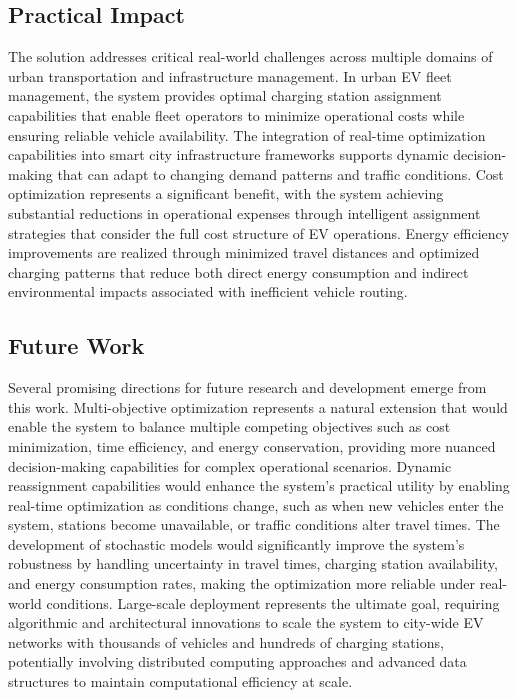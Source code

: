 \documentclass[12pt,a4paper]{article}
\begin{document}
\subsection{Practical Impact}

The solution addresses critical real-world challenges across multiple domains of urban transportation and infrastructure management. In urban EV fleet management, the system provides optimal charging station assignment capabilities that enable fleet operators to minimize operational costs while ensuring reliable vehicle availability. The integration of real-time optimization capabilities into smart city infrastructure frameworks supports dynamic decision-making that can adapt to changing demand patterns and traffic conditions. Cost optimization represents a significant benefit, with the system achieving substantial reductions in operational expenses through intelligent assignment strategies that consider the full cost structure of EV operations. Energy efficiency improvements are realized through minimized travel distances and optimized charging patterns that reduce both direct energy consumption and indirect environmental impacts associated with inefficient vehicle routing.

\subsection{Future Work}

Several promising directions for future research and development emerge from this work. Multi-objective optimization represents a natural extension that would enable the system to balance multiple competing objectives such as cost minimization, time efficiency, and energy conservation, providing more nuanced decision-making capabilities for complex operational scenarios. Dynamic reassignment capabilities would enhance the system's practical utility by enabling real-time optimization as conditions change, such as when new vehicles enter the system, stations become unavailable, or traffic conditions alter travel times. The development of stochastic models would significantly improve the system's robustness by handling uncertainty in travel times, charging station availability, and energy consumption rates, making the optimization more reliable under real-world conditions. Large-scale deployment represents the ultimate goal, requiring algorithmic and architectural innovations to scale the system to city-wide EV networks with thousands of vehicles and hundreds of charging stations, potentially involving distributed computing approaches and advanced data structures to maintain computational efficiency at scale.
\end{document}
